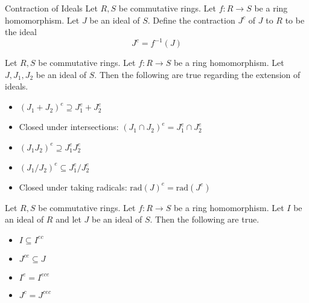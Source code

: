 \documentclass[a4paper]{article}
\begin{document}
\begin{defn}{Contraction of Ideals}{} Let $R,S$ be commutative rings. Let $f:R\to S$ be a ring homomorphism. Let $J$ be an ideal of $S$. Define the contraction $J^c$ of $J$ to $R$ to be the ideal $$J^c=f^{-1}(J)$$
\end{defn}

\begin{prp}{}{} Let $R,S$ be commutative rings. Let $f:R\to S$ be a ring homomorphism. Let $J,J_1,J_2$ be an ideal of $S$. Then the following are true regarding the extension of ideals. 
\begin{itemize}
\item $(J_1+J_2)^e\supseteq J_1^e+J_2^e$
\item Closed under intersections: $(J_1\cap J_2)^e=J_1^e\cap J_2^e$
\item $(J_1J_2)^e\supseteq J_1^eJ_2^e$
\item $(J_1/J_2)^e\subseteq J_1^e/J_2^e$
\item Closed under taking radicals: $\text{rad}(J)^e=\text{rad}(J^e)$
\end{itemize}
\end{prp}

\begin{prp}{}{} Let $R,S$ be commutative rings. Let $f:R\to S$ be a ring homomorphism. Let $I$ be an ideal of $R$ and let $J$ be an ideal of $S$. Then the following are true. 
\begin{itemize}
\item $I\subseteq I^{ec}$
\item $J^{ce}\subseteq J$
\item $I^e=I^{ece}$
\item $J^c=J^{cec}$
\end{itemize}
\end{prp}
\end{document}
